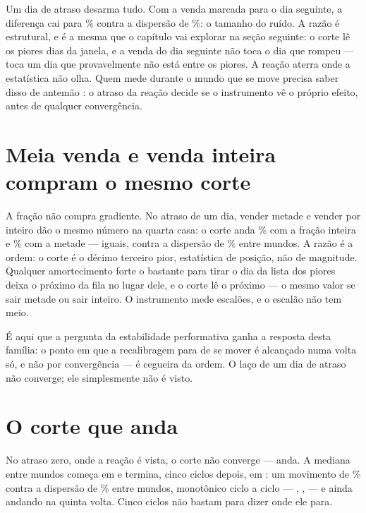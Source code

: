Um dia de atraso desarma tudo. Com a venda marcada para o dia seguinte, a diferença cai para
\numLacoDiferencaFracaoInteiraMedianaPct\% contra a dispersão de
\numLacoDiferencaFracaoInteiraDispersaoPct\%: o tamanho do ruído. A razão é estrutural, e é a
mesma que o capítulo vai explorar na seção seguinte: o corte lê os piores dias da janela, e a
venda do dia seguinte não toca o dia que rompeu --- toca um dia que provavelmente não está entre
os piores. A reação aterra onde a estatística não olha. Quem mede durante o mundo que se move
precisa saber disso de antemão \cite{mendlerdunner2020stochastic}: o atraso da reação decide se o
instrumento vê o próprio efeito, antes de qualquer convergência.

\section{Meia venda e venda inteira compram o mesmo corte}

A fração não compra gradiente. No atraso de um dia, vender metade e vender por inteiro dão o
mesmo número na quarta casa: o corte anda \numLacoCorteAndouFracaoInteiraPct\% com a fração
inteira e \numLacoCorteAndouMeiaFracaoPct\% com a metade --- iguais, contra a dispersão de
\numLacoCorteAndouFracaoInteiraDispersaoPct\% entre mundos. A razão é a ordem: o corte é o
décimo terceiro pior, estatística de posição, não de magnitude. Qualquer amortecimento forte o
bastante para tirar o dia da lista dos piores deixa o próximo da fila no lugar dele, e o corte lê
o próximo --- o mesmo valor se sair metade ou sair inteiro. O instrumento mede escalões, e o
escalão não tem meio.

É aqui que a pergunta da estabilidade performativa \cite{perdomo2020performative} ganha a resposta
desta família: o ponto em que a recalibragem para de se mover é alcançado numa volta só, e não por
convergência --- é cegueira da ordem. O laço de um dia de atraso não converge; ele simplesmente
não é visto.

\section{O corte que anda}

No atraso zero, onde a reação é vista, o corte não converge --- anda. A mediana entre mundos começa
em \numLacoCorteCicloPrimeiroFracaoInteiraAtrasoZero{} e termina, cinco ciclos depois, em
\numLacoCorteCicloQuintoFracaoInteiraAtrasoZero{}: um movimento de
\numLacoCorteAndouFracaoInteiraAtrasoZeroPct\% contra a dispersão de
\numLacoCorteAndouFracaoInteiraAtrasoZeroDispersaoPct\% entre mundos, monotônico ciclo a ciclo
--- \numLacoCorteCicloSegundoFracaoInteiraAtrasoZero{},
\numLacoCorteCicloTerceiroFracaoInteiraAtrasoZero{},
\numLacoCorteCicloQuartoFracaoInteiraAtrasoZero{} --- e ainda andando na quinta volta. Cinco
ciclos não bastam para dizer onde ele para.

